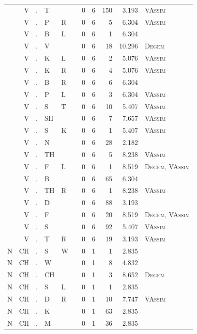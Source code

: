 \documentclass[12pt]{article}
\begin{document}
\begin{longtable}{r@{ } r@{ } c@{ } l@{ } l@{ } l@{ } r r r r l }
 & V & . & T &  &  & 0 & 6 & 150 & 3.193 & \textsc{VAssim} \\
 & V & . & P & R &  & 0 & 6 & 5 & 6.304 & \textsc{VAssim} \\
 & V & . & B & L &  & 0 & 6 & 1 & 6.304 &  \\
 & V & . & V &  &  & 0 & 6 & 18 & 10.296 & \textsc{Degem} \\
 & V & . & K & L &  & 0 & 6 & 2 & 5.076 & \textsc{VAssim} \\
 & V & . & K & R &  & 0 & 6 & 4 & 5.076 & \textsc{VAssim} \\
 & V & . & B & R &  & 0 & 6 & 6 & 6.304 &  \\
 & V & . & P & L &  & 0 & 6 & 3 & 6.304 & \textsc{VAssim} \\
 & V & . & S & T &  & 0 & 6 & 10 & 5.407 & \textsc{VAssim} \\
 & V & . & SH &  &  & 0 & 6 & 7 & 7.657 & \textsc{VAssim} \\
 & V & . & S & K &  & 0 & 6 & 1 & 5.407 & \textsc{VAssim} \\
 & V & . & N &  &  & 0 & 6 & 28 & 2.182 &  \\
 & V & . & TH &  &  & 0 & 6 & 5 & 8.238 & \textsc{VAssim} \\
 & V & . & F & L &  & 0 & 6 & 1 & 8.519 & \textsc{Degem}, \textsc{VAssim} \\
 & V & . & B &  &  & 0 & 6 & 65 & 6.304 &  \\
 & V & . & TH & R &  & 0 & 6 & 1 & 8.238 & \textsc{VAssim} \\
 & V & . & D &  &  & 0 & 6 & 88 & 3.193 &  \\
 & V & . & F &  &  & 0 & 6 & 20 & 8.519 & \textsc{Degem}, \textsc{VAssim} \\
 & V & . & S &  &  & 0 & 6 & 92 & 5.407 & \textsc{VAssim} \\
 & V & . & T & R &  & 0 & 6 & 19 & 3.193 & \textsc{VAssim} \\
N & CH & . & S & W &  & 0 & 1 & 1 & 2.835 &  \\
N & CH & . & W &  &  & 0 & 1 & 8 & 4.832 &  \\
N & CH & . & CH &  &  & 0 & 1 & 3 & 8.652 & \textsc{Degem} \\
N & CH & . & S & L &  & 0 & 1 & 1 & 2.835 &  \\
N & CH & . & D & R &  & 0 & 1 & 10 & 7.747 & \textsc{VAssim} \\
N & CH & . & K &  &  & 0 & 1 & 63 & 2.835 &  \\
N & CH & . & M &  &  & 0 & 1 & 36 & 2.835 &  \\

\end{longtable}
\end{document}
